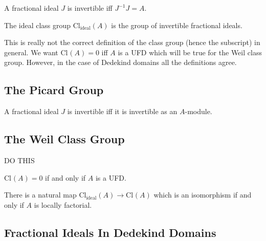 \documentclass[12pt]{article}
\begin{document}
\begin{cor}
A fractional ideal $J$ is invertible iff $J^{-1} J = A$.
\end{cor}

\renewcommand{\Cl}[2][]{\mathrm{Cl}_{#1} \left( #2 \right)}

\begin{defn}
The ideal class group $\Cl[\text{ideal}]{A}$ is the group of invertible fractional ideals.
\end{defn}

\begin{rmk}
This is really not the correct definition of the class group (hence the subscript) in general. We want $\Cl{A} = 0$ iff $A$ is a UFD which will be true for the Weil class group. However, in the case of Dedekind domains all the definitions agree. 
\end{rmk}

\subsection{The Picard Group}

\begin{prop}
A fractional ideal $J$ is invertible iff it is invertible as an $A$-module. 
\end{prop}

\begin{cor}

\end{cor}

\subsection{The Weil Class Group}

\begin{defn}
DO THIS
\end{defn}

\begin{prop}
$\Cl{A} = 0$ if and only if $A$ is a UFD.
\end{prop}

\begin{prop}
There is a natural map $\Cl[\text{ideal}]{A} \to \Cl{A}$ which is an isomorphism if and only if $A$ is locally factorial. 
\end{prop}

\subsection{Fractional Ideals In Dedekind Domains}
\end{document}
